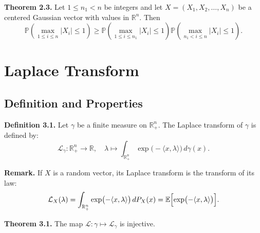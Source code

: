 \documentclass[12pt]{article}
\begin{document}
\vspace{0.3cm}

\textbf{Theorem 2.3.} Let $1 \leq n_1 < n$ be integers and let $X = (X_1, X_2, \dots, X_n)$ be a centered Gaussian vector with values in $\mathbb{R}^n$. Then
\[
\mathbb{P} \left( \max_{1 \leq i \leq n} |X_i| \leq 1 \right) \geq \mathbb{P} \left( \max_{1 \leq i \leq n_1} |X_i| \leq 1 \right) \mathbb{P} \left( \max_{n_1 < i \leq n} |X_i| \leq 1 \right).
\]

\newpage
\section{Laplace Transform}
\subsection{Definition and Properties}

\textbf{Definition 3.1.} Let $\gamma$ be a finite measure on $\mathbb{R}_+^n$. The Laplace transform of $\gamma$ is defined by:
\[
\mathcal{L}_\gamma : \mathbb{R}_+^n \longrightarrow \mathbb{R}, \quad \lambda \longmapsto \int_{\mathbb{R}_+^n} \exp\bigl(-\langle x, \lambda \rangle\bigr)\, d\gamma(x).
\]

\textbf{Remark.} If $X$ is a random vector, its Laplace transform is the transform of its law:
\[
\mathcal{L}_X(\lambda) = \int_{\mathbb{R}_+^n} \exp\bigl(-\langle x, \lambda \rangle\bigr)\, dP_X(x) = \mathbb{E}\Bigl[\exp\bigl(-\langle x, \lambda \rangle\bigr)\Bigr].
\]

\textbf{Theorem 3.1.} The map
$\mathcal{L} : \gamma \longmapsto \mathcal{L}_\gamma$
is injective.
\end{document}
